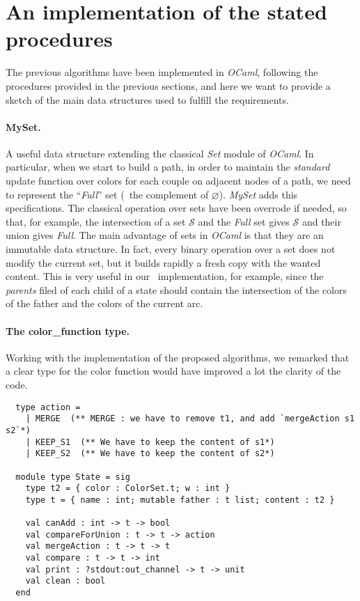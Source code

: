\section{An implementation of the stated procedures}

The previous algorithms have been implemented in \textit{OCaml}, following the procedures provided in the previous sections, and here we want to provide a sketch of the main data structures used to fulfill the requirements.

\paragraph{MySet.} A useful data structure extending the classical \textit{Set} module of \textit{OCaml}. In particular, when we start to build a path, in order to maintain the \textit{standard} update function over colors for each couple on adjacent nodes of a path, we need to represent the ``\textit{Full}'' set (\ie\ the complement of $\varnothing$). \textit{MySet} adds this specifications. The classical operation over sets have been overrode if needed, so that, for example, the intersection of a set $\mathcal{S}$ and the \textit{Full} set gives $\mathcal{S}$ and their union gives \textit{Full}. The main advantage of sets in \textit{OCaml} is that they are an immutable data structure. In fact, every binary operation over a set does not modify the current set, but it builds rapidly a fresh copy with the wanted content. This is very useful in our \mdd\ implementation, for example, since the \textit{parents} filed of each child of a state should contain the intersection of the colors of the father and the colors of the current arc.

\paragraph{The color\_function type.} Working with the implementation of the proposed algorithms, we remarked that a clear type for the color function would have improved a lot the clarity of the code.

\begin{verbatim}
  type action =
    | MERGE  (** MERGE : we have to remove t1, and add `mergeAction s1 s2`*)
    | KEEP_S1  (** We have to keep the content of s1*)
    | KEEP_S2  (** We have to keep the content of s2*)

  module type State = sig
    type t2 = { color : ColorSet.t; w : int }
    type t = { name : int; mutable father : t list; content : t2 }

    val canAdd : int -> t -> bool
    val compareForUnion : t -> t -> action
    val mergeAction : t -> t -> t
    val compare : t -> t -> int
    val print : ?stdout:out_channel -> t -> unit
    val clean : bool
  end
\end{verbatim}

